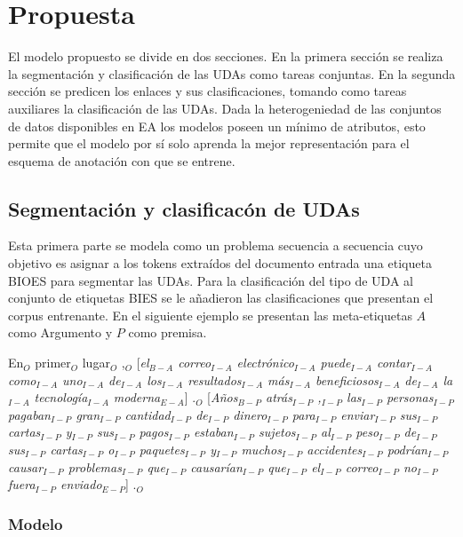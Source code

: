 \chapter{Propuesta}\label{chapter:proposal}

El modelo propuesto se divide en dos secciones. En la primera sección se realiza la segmentación y clasificación de 
las UDAs como tareas conjuntas. En la segunda sección se predicen los enlaces y sus clasificaciones, tomando
como tareas auxiliares la clasificación de las UDAs. Dada la heterogeniedad de las conjuntos de datos disponibles 
en EA los modelos poseen un mínimo de atributos, esto permite que el modelo por sí solo aprenda 
la mejor representación para el esquema de anotación con que se entrene.

\section{Segmentación y clasificacón de UDAs}

Esta primera parte se modela como un problema secuencia a secuencia cuyo objetivo es asignar a los tokens 
extraídos del documento entrada una etiqueta BIOES para segmentar las UDAs. Para la clasificación del tipo 
de UDA al conjunto de etiquetas BIES se le añadieron las clasificaciones que presentan el corpus entrenante.
En el siguiente ejemplo se presentan las meta-etiquetas
$A$ como Argumento y $P$ como premisa.

\begin{adjustwidth}{25pt}{25pt}
    En$_O$ primer$_O$ lugar$_O$ ,$_O$ [\emph{el$_{B-A}$ correo$_{I-A}$ electrónico$_{I-A}$ puede$_{I-A}$ 
    contar$_{I-A}$ como$_{I-A}$ uno$_{I-A}$ de$_{I-A}$ los$_{I-A}$ resultados$_{I-A}$
    más$_{I-A}$ beneficiosos$_{I-A}$ de$_{I-A}$ la$_{I-A}$ tecnología$_{I-A}$ moderna$_{E-A}$}] .$_{O}$ 
    [\emph{Años$_{B-P}$ atrás$_{I-P}$ ,$_{I-P}$ las$_{I-P}$ personas$_{I-P}$ pagaban$_{I-P}$ gran$_{I-P}$ cantidad$_{I-P}$ 
    de$_{I-P}$ dinero$_{I-P}$ para$_{I-P}$ enviar$_{I-P}$ sus$_{I-P}$ cartas$_{I-P}$ y$_{I-P}$ sus$_{I-P}$ 
    pagos$_{I-P}$ estaban$_{I-P}$ sujetos$_{I-P}$ al$_{I-P}$ peso$_{I-P}$ de$_{I-P}$ sus$_{I-P}$ 
    cartas$_{I-P}$ o$_{I-P}$ paquetes$_{I-P}$ y$_{I-P}$ muchos$_{I-P}$ accidentes$_{I-P}$ podrían$_{I-P}$
    causar$_{I-P}$ problemas$_{I-P}$ que$_{I-P}$ causarían$_{I-P}$ que$_{I-P}$ el$_{I-P}$ correo$_{I-P}$ 
    no$_{I-P}$ fuera$_{I-P}$ enviado$_{E-P}$}] .$_{O}$
\end{adjustwidth}

\subsection{Modelo}

